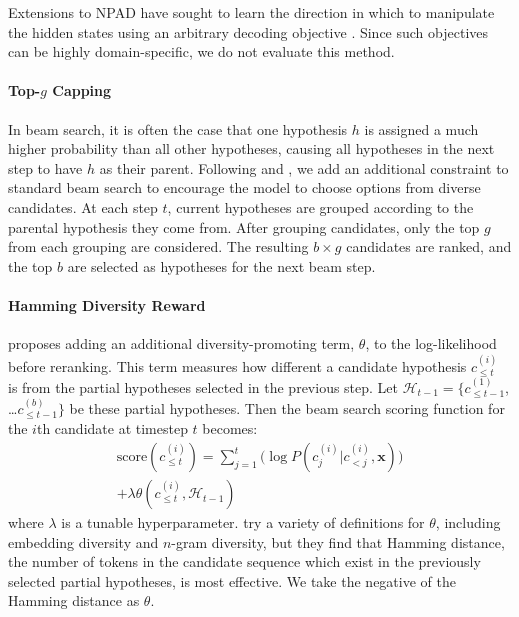 Extensions to NPAD have sought to learn the direction in which to manipulate the hidden states using an arbitrary decoding objective \cite{gu2017trainable}.
Since such objectives can be highly domain-specific, we do not evaluate this method.

\paragraph{Top-$g$ Capping}\quad
In beam search, it is often the case that one hypothesis $h$ is assigned a much higher probability than all other hypotheses, causing all hypotheses in the next step to have $h$ as their parent. Following \citet{li2016mutual} and \citet{li2016simple}, we add an additional constraint to standard beam search to encourage the model to choose options from diverse candidates.
At each step $t$, current hypotheses are grouped according to the parental hypothesis they come from.
After grouping candidates, only the top $g$ from each grouping are considered. The resulting $b \times g$ candidates are ranked, and the top $b$ are selected as hypotheses for the next beam step.

\paragraph{Hamming Diversity Reward}\quad
\citet{vijayakumar2016diverse} proposes adding an additional diversity-promoting term, $\theta$, to the log-likelihood before reranking.
This term measures how different a candidate hypothesis $c^{(i)}_{\leq t}$ is from the partial hypotheses selected in the previous step. Let $\mathcal{H}_{t-1} = \{c^{(1)}_{\leq t-1}$, \ldots $c^{(b)}_{\leq t-1}\}$ be these partial hypotheses.
Then the beam search scoring function for the $i$th candidate at timestep $t$ becomes:
\begin{align*}
    \text{score}(c^{(i)}_{\leq t}) = \sum_{j=1}^t \big(\log P(c^{(i)}_j | c^{(i)}_{<j}, \textbf{x})\big) \\+ \lambda\theta(c^{(i)}_{\leq t}, \mathcal{H}_{t-1})
\end{align*}
where $\lambda$ is a tunable hyperparameter. \citet{vijayakumar2016diverse} try a variety of definitions for $\theta$, including embedding diversity and $n$-gram diversity, but they find that Hamming distance, the number of tokens in the candidate sequence which exist in the previously selected partial hypotheses, is most effective. We take the negative of the Hamming distance as $\theta$.


